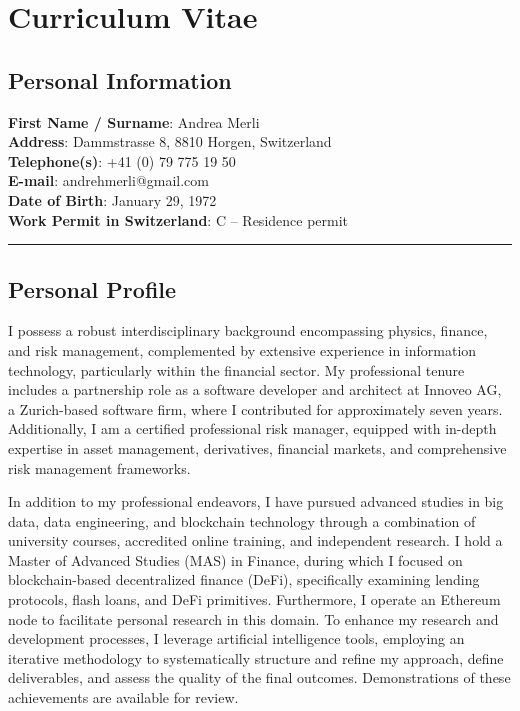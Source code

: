 \section{Curriculum Vitae}\label{curriculum-vitae}

\subsection{Personal Information}\label{personal-information}

\textbf{First Name / Surname}: Andrea Merli\\
\textbf{Address}: Dammstrasse 8, 8810 Horgen, Switzerland\\
\textbf{Telephone(s)}: +41 (0) 79 775 19 50\\
\textbf{E-mail}: andrehmerli@gmail.com\\
\textbf{Date of Birth}: January 29, 1972\\
\textbf{Work Permit in Switzerland}: C -- Residence permit

\begin{center}\rule{0.5\linewidth}{0.5pt}\end{center}

\subsection{Personal Profile}\label{personal-profile}

I possess a robust interdisciplinary background encompassing physics,
finance, and risk management, complemented by extensive experience in
information technology, particularly within the financial sector. My
professional tenure includes a partnership role as a software developer
and architect at Innoveo AG, a Zurich-based software firm, where I
contributed for approximately seven years. Additionally, I am a
certified professional risk manager, equipped with in-depth expertise in
asset management, derivatives, financial markets, and comprehensive risk
management frameworks.

In addition to my professional endeavors, I have pursued advanced
studies in big data, data engineering, and blockchain technology through
a combination of university courses, accredited online training, and
independent research. I hold a Master of Advanced Studies (MAS) in
Finance, during which I focused on blockchain-based decentralized
finance (DeFi), specifically examining lending protocols, flash loans,
and DeFi primitives. Furthermore, I operate an Ethereum node to
facilitate personal research in this domain. To enhance my research and
development processes, I leverage artificial intelligence tools,
employing an iterative methodology to systematically structure and
refine my approach, define deliverables, and assess the quality of the
final outcomes. Demonstrations of these achievements are available for
review.

